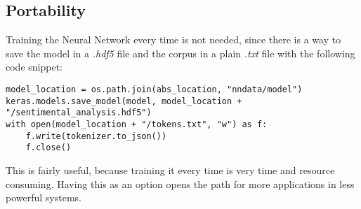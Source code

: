 \subsection{Portability}
Training the Neural Network every time is not needed, since there is a way to save the model in a \textit{.hdf5} file and the corpus in a plain \textit{.txt} file with the following code snippet:
\begin{lstlisting}
model_location = os.path.join(abs_location, "nndata/model")
keras.models.save_model(model, model_location + 
"/sentimental_analysis.hdf5")
with open(model_location + "/tokens.txt", "w") as f:
    f.write(tokenizer.to_json())
    f.close()
\end{lstlisting}
This is fairly useful, because training it every time is very time and resource consuming. Having this as an option opens the path for more applications in less powerful systems.